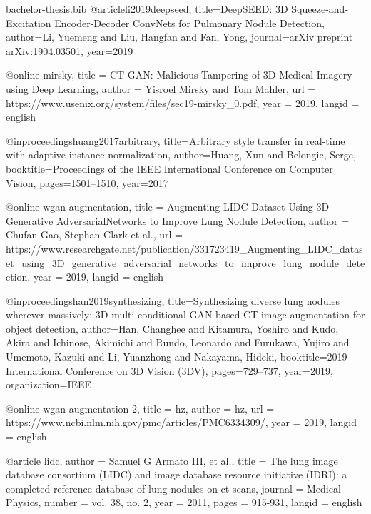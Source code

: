 \begin{filecontents}{bachelor-thesis.bib}
@article{li2019deepseed,
  title={DeepSEED: 3D Squeeze-and-Excitation Encoder-Decoder ConvNets for Pulmonary Nodule Detection},
  author={Li, Yuemeng and Liu, Hangfan and Fan, Yong},
  journal={arXiv preprint arXiv:1904.03501},
  year={2019}
}

@online{ mirsky,
    title       = {CT-GAN: Malicious Tampering of 3D Medical Imagery using Deep Learning},
    author      = {Yisroel Mirsky and Tom Mahler},
    url         = {https://www.usenix.org/system/files/sec19-mirsky_0.pdf},
    year        = {2019},
    langid      = {english}
}

@inproceedings{huang2017arbitrary,
  title={Arbitrary style transfer in real-time with adaptive instance normalization},
  author={Huang, Xun and Belongie, Serge},
  booktitle={Proceedings of the IEEE International Conference on Computer Vision},
  pages={1501--1510},
  year={2017}
}


@online{ wgan-augmentation,
    title       = {Augmenting LIDC Dataset Using 3D Generative AdversarialNetworks to Improve Lung Nodule Detection},
    author      = {Chufan Gao, Stephan Clark et al.},
    url         = {https://www.researchgate.net/publication/331723419_Augmenting_LIDC_dataset_using_3D_generative_adversarial_networks_to_improve_lung_nodule_detection},
    year        = {2019},
    langid      = {english}
}

@inproceedings{han2019synthesizing,
  title={Synthesizing diverse lung nodules wherever massively: 3D multi-conditional GAN-based CT image augmentation for object detection},
  author={Han, Changhee and Kitamura, Yoshiro and Kudo, Akira and Ichinose, Akimichi and Rundo, Leonardo and Furukawa, Yujiro and Umemoto, Kazuki and Li, Yuanzhong and Nakayama, Hideki},
  booktitle={2019 International Conference on 3D Vision (3DV)},
  pages={729--737},
  year={2019},
  organization={IEEE}
}

@online{ wgan-augmentation-2,
    title       = {hz},
    author      = {hz},
    url         = {https://www.ncbi.nlm.nih.gov/pmc/articles/PMC6334309/},
    year        = {2019},
    langid      = {english}
}

@article{ lidc,
    author      = {Samuel G Armato III, et al.},
    title       = {The lung image database consortium (LIDC) and image database resource initiative (IDRI): a completed reference database of lung nodules on ct scans},
    journal     = {Medical Physics},
    number      = {vol. 38, no. 2},
    year        = {2011},
    pages       = {915-931},
    langid      = {english}
}


\end{filecontents}
